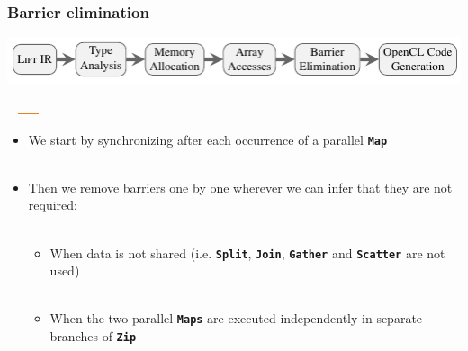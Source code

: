\documentclass[10pt,usetotalslideindicator]{beamer}
\newcommand{\code}[1]{\textbf{\texttt{#1}}}
\begin{document}
\begin{frame}[t]
\frametitle{Barrier elimination}
    \vspace{-1cm}
    \begin{block}{}
        \begin{center}
            \includegraphics[width=1\textwidth]{../images/compilation_stages.pdf}
        \end{center}
        \vspace{-1.05cm}
        \hspace{6.9cm}
        \includegraphics[width=1.25cm, height=0.03cm]{../images/orange_bar.png}
        \vspace{.45cm}
    \end{block}
    \vspace{-0.5cm}
\begin{itemize}
	\item We start by synchronizing after each occurrence of a parallel \code{Map}\\
	\
	\item Then we remove barriers one by one wherever we can infer that they are not required:\\
	\
	\begin{itemize}
		\item When data is not shared (i.e. \code{Split}, \code{Join}, \code{Gather} and \code{Scatter} are not used)\\
		\
		\item When the two parallel \code{Maps} are executed independently in separate branches of \code{Zip}
	\end{itemize}
\end{itemize}
\end{frame}
\end{document}
